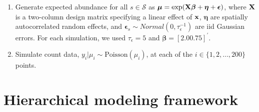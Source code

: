 \documentclass[12pt,fleqn]{article}
\def\bfx{{\bf x}}
\def\bfeta{\boldsymbol{\eta}}
\def\bfbeta{\boldsymbol{\beta}}
\def\bfmu{\boldsymbol{\mu}}
\def\bfepsilon{\boldsymbol{\epsilon}}
\begin{document}
\begin{flushleft}
\begin{enumerate}
  \item  Generate expected abundance for all $s \in \mathcal{S}$ as $\bfmu = \exp( {\bf X}\bfbeta + \bfeta +\bfepsilon )$, where ${\bf X}$ is a two-column design matrix specifying a linear effect of $\bfx$, $\bfeta$ are spatially autocorrelated random effects, and $\bfepsilon_s \sim Normal(0,\tau_\epsilon^{-1})$ are iid Gaussian errors.  For each simulation, we used $\tau_\epsilon = 5$ and $\bfbeta = [2.0 0.75]^\prime$.
  \item Simulate count data, $y_i|\mu_i \sim \textrm{Poisson}(\mu_i)$, at each of the $i \in \{ 1,2,\hdots,200 \}$ points.
\end{enumerate}
  

\section{Hierarchical modeling framework}


\end{flushleft}
\end{document}
